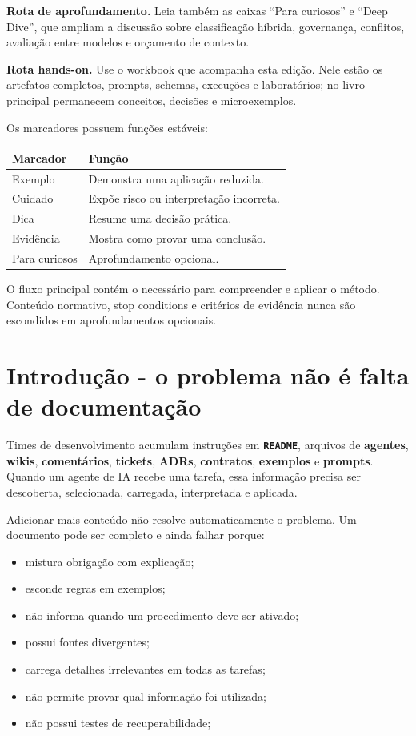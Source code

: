 \documentclass[
  10pt,
  a4paper,
  oneside]{book}
\providecommand{\tightlist}{%
  \setlength{\itemsep}{0pt}\setlength{\parskip}{0pt}}
\begin{document}
\textbf{Rota de aprofundamento.} Leia também as caixas ``Para curiosos''
e ``Deep Dive'', que ampliam a discussão sobre classificação híbrida,
governança, conflitos, avaliação entre modelos e orçamento de contexto.

\textbf{Rota hands-on.} Use o workbook que acompanha esta edição. Nele
estão os artefatos completos, prompts, schemas, execuções e
laboratórios; no livro principal permanecem conceitos, decisões e
microexemplos.

Os marcadores possuem funções estáveis:

\begin{longtable}[]{@{}ll@{}}
\toprule\noalign{}
Marcador & Função \\
\midrule\noalign{}
\endhead
\bottomrule\noalign{}
\endlastfoot
Exemplo & Demonstra uma aplicação reduzida. \\
Cuidado & Expõe risco ou interpretação incorreta. \\
Dica & Resume uma decisão prática. \\
Evidência & Mostra como provar uma conclusão. \\
Para curiosos & Aprofundamento opcional. \\
\end{longtable}

O fluxo principal contém o necessário para compreender e aplicar o
método. Conteúdo normativo, stop conditions e critérios de evidência
nunca são escondidos em aprofundamentos opcionais.

\hypertarget{introduuxe7uxe3o---o-problema-nuxe3o-uxe9-falta-de-documentauxe7uxe3o}{%
\chapter{Introdução - o problema não é falta de
documentação}\label{introduuxe7uxe3o---o-problema-nuxe3o-uxe9-falta-de-documentauxe7uxe3o}}

Times de desenvolvimento acumulam instruções em
\textbf{\texttt{README}}, arquivos de \textbf{agentes}, \textbf{wikis},
\textbf{comentários}, \textbf{tickets}, \textbf{ADRs},
\textbf{contratos}, \textbf{exemplos} e \textbf{prompts}. Quando um
agente de IA recebe uma tarefa, essa informação precisa ser descoberta,
selecionada, carregada, interpretada e aplicada.

Adicionar mais conteúdo não resolve automaticamente o problema. Um
documento pode ser completo e ainda falhar porque:

\begin{itemize}
\tightlist
\item
  mistura obrigação com explicação;
\item
  esconde regras em exemplos;
\item
  não informa quando um procedimento deve ser ativado;
\item
  possui fontes divergentes;
\item
  carrega detalhes irrelevantes em todas as tarefas;
\item
  não permite provar qual informação foi utilizada;
\item
  não possui testes de recuperabilidade;
\end{itemize}
\end{document}
